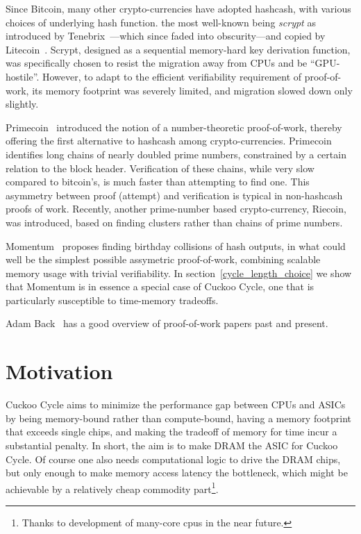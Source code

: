 \documentclass[11pt, oneside]{article}
\begin{document}
Since Bitcoin, many other crypto-currencies have adopted hashcash, with various
choices of underlying hash function. the most well-known being {\em scrypt} as
introduced by Tenebrix~\cite{tenebrix2011}---which since faded into obscurity---and
copied by Litecoin~\cite{litecoin2011}.
Scrypt, designed as a sequential memory-hard key derivation function,
was specifically chosen to resist the migration away from CPUs and be ``GPU-hostile''.
However, to adapt to the efficient verifiability requirement of proof-of-work, its
memory footprint was severely limited, and migration slowed down only slightly.

Primecoin~\cite{king2013} introduced the notion of a number-theoretic proof-of-work,
thereby offering the first alternative to hashcash among crypto-currencies.
Primecoin identifies long chains of nearly doubled prime numbers, constrained
by a certain relation to the block header.
Verification of these chains, while very slow compared to bitcoin's, is much faster
than attempting to find one.
This asymmetry between proof (attempt) and verification is typical in non-hashcash proofs of work.
Recently, another prime-number based crypto-currency, Riecoin, was introduced, based
on finding clusters rather than chains of prime numbers.

Momentum~\cite{larimer2013} proposes finding birthday collisions of hash outputs,
in what could well be the simplest possible assymetric proof-of-work,
combining scalable memory usage with trivial verifiability.
In section~\ref{cycle_length_choice} we show that Momentum is in essence a special case of Cuckoo Cycle,
one that is particularly susceptible to time-memory tradeoffs.

Adam Back~\cite{back2014} has a good overview of proof-of-work papers past
and present.

\section{Motivation}
Cuckoo Cycle aims to minimize the performance gap between CPUs and ASICs by being memory-bound
rather than compute-bound, having a memory footprint that exceeds single chips, and making the
tradeoff of memory for time incur a substantial penalty. In short, the aim is to make DRAM
the ASIC for Cuckoo Cycle. Of course one also needs computational logic to drive the DRAM chips,
but only enough to make memory access latency the bottleneck, which might be achievable by
a relatively cheap commodity part\footnote{Thanks to development of many-core cpus in the near future.}.
\end{document}
